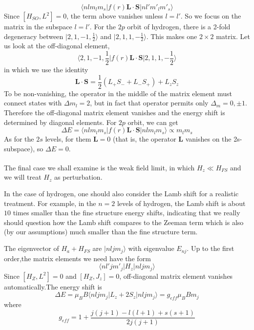 \[\langle n l m_l m_s | f(r)\bm{L}\cdot\bm{S}| n l' m'_l m'_s\rangle\]
Since $[H_{SO},L^2] = 0$, the term above vanishes unless $l = l'$. So we focus on the matrix in the subspace $l = l'$. For the $2p$ orbit of hydrogen, there is a 2-fold degeneracy between $|2,1,-1,\frac{1}{2}\rangle$ and $|2,1,1,-\frac{1}{2}\rangle$.
This makes one $2 \times 2$ matrix. Let us look at the off-diagonal element,
\[\langle 2,1,-1,\frac{1}{2} | f(r)\bm{L}\cdot\bm{S}| 2,1,1,-\frac{1}{2}\rangle\]
in which we use the identity
\[\bm{L}\cdot\bm{S} = \frac{1}{2}(L_+S_-+L_-S_+)+L_zS_z\]
To be non-vanishing, the operator in the middle of the matrix element must connect states with $\Delta m_l = 2$, but in fact that operator permits only $\Delta_m = 0,\pm1$. Therefore the off-diagonal matrix element vanishes and the energy shift is determined by diagonal elements. For $2p$ orbit, we can get
\[\Delta E = \langle n l m_l m_s | f(r)\bm{L}\cdot\bm{S}| n l m_l m_s\rangle \propto m_lm_s\]
As for the $2s$ levels, for them $\bm{L} = 0$ (that is, the operator $\bm{L}$ vanishes on the 2s-subspace), so $\Delta E = 0$.\\ \\
The final case we shall examine is the weak field limit, in which $H_z \ll H_{FS}$ and we will treat $H_z$ as perturbation.
\begin{note}
In the case of hydrogen, one should also consider the Lamb shift for a realistic treatment. For example, in the $n=2$ levels of hydrogen, the Lamb shift is about $10$ times smaller than the fine structure energy shifts, indicating that we really should question how the Lamb shift compares to the Zeeman term which is also (by our assumptions) much smaller than the fine structure term.
\end{note}
\noindent
The eigenvector of $H_a + H_{FS}$ are $|nljm_j\rangle$ with eigenvalue $E_{nj}$. Up to the first order,the matrix elements we need have the form
\[\langle n l' j m'_j | H_z | n l j m_j\rangle\]
Since $[H_Z,L^2] = 0$ and $[H_Z,J_z] = 0$, off-diagonal matrix element vanishes automatically.The energy shift is
\[\Delta E = \mu_B B\langle n l j m_j | L_z + 2S_z | n l j m_j\rangle = g_{eff} \mu_B B m_j\]
where
\[g_{eff} = 1 + \frac{j(j+1)-l(l+1)+s(s+1)}{2j(j+1)}\]

